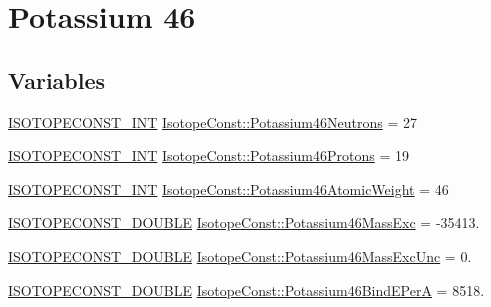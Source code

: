 \hypertarget{group___isotope_const-_potassium-_k46}{}\section{Potassium 46}
\label{group___isotope_const-_potassium-_k46}
\subsection*{Variables}
\begin{DoxyCompactItemize}
\item 
\mbox{\hyperlink{group___isotope_const-_macros_ga5f18360b3e99483a35c32d789e62621c}{I\+S\+O\+T\+O\+P\+E\+C\+O\+N\+S\+T\+\_\+\+I\+NT}} \mbox{\hyperlink{group___isotope_const-_potassium-_k46_gacc72c680c3e9f6fbf506c1745b612740}{Isotope\+Const\+::\+Potassium46\+Neutrons}} = 27
\item 
\mbox{\hyperlink{group___isotope_const-_macros_ga5f18360b3e99483a35c32d789e62621c}{I\+S\+O\+T\+O\+P\+E\+C\+O\+N\+S\+T\+\_\+\+I\+NT}} \mbox{\hyperlink{group___isotope_const-_potassium-_k46_ga08b046994b672aabffa60455dfa48636}{Isotope\+Const\+::\+Potassium46\+Protons}} = 19
\item 
\mbox{\hyperlink{group___isotope_const-_macros_ga5f18360b3e99483a35c32d789e62621c}{I\+S\+O\+T\+O\+P\+E\+C\+O\+N\+S\+T\+\_\+\+I\+NT}} \mbox{\hyperlink{group___isotope_const-_potassium-_k46_gaa914276660f5213a4f463f9544022f65}{Isotope\+Const\+::\+Potassium46\+Atomic\+Weight}} = 46
\item 
\mbox{\hyperlink{group___isotope_const-_macros_ga8f45a7272ce02c0b4c65c44636ed719a}{I\+S\+O\+T\+O\+P\+E\+C\+O\+N\+S\+T\+\_\+\+D\+O\+U\+B\+LE}} \mbox{\hyperlink{group___isotope_const-_potassium-_k46_ga40e1dd4ce4fa0d02b65088e6972fb536}{Isotope\+Const\+::\+Potassium46\+Mass\+Exc}} = -\/35413.
\item 
\mbox{\hyperlink{group___isotope_const-_macros_ga8f45a7272ce02c0b4c65c44636ed719a}{I\+S\+O\+T\+O\+P\+E\+C\+O\+N\+S\+T\+\_\+\+D\+O\+U\+B\+LE}} \mbox{\hyperlink{group___isotope_const-_potassium-_k46_ga4eea026db9c2267b863ef451b062d8f8}{Isotope\+Const\+::\+Potassium46\+Mass\+Exc\+Unc}} = 0.
\item 
\mbox{\hyperlink{group___isotope_const-_macros_ga8f45a7272ce02c0b4c65c44636ed719a}{I\+S\+O\+T\+O\+P\+E\+C\+O\+N\+S\+T\+\_\+\+D\+O\+U\+B\+LE}} \mbox{\hyperlink{group___isotope_const-_potassium-_k46_ga0f8a3060eaa2e22066291df3734add8a}{Isotope\+Const\+::\+Potassium46\+Bind\+E\+PerA}} = 8518.
\item 

\end{DoxyCompactItemize}
